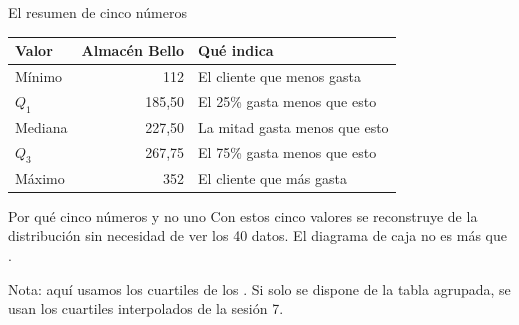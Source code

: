 \documentclass[aspectratio=169,10pt]{beamer}
\begin{document}
\begin{frame}{El resumen de cinco números}
  \footnotesize
  \begin{center}
  \begin{tabular}{@{}lrl@{}}
    \toprule
    \textbf{Valor} & \textbf{Almacén Bello} & \textbf{Qué indica} \\
    \midrule
    Mínimo   & 112 & El cliente que menos gasta \\
    $Q_1$    & 185{,}50 & El 25\% gasta menos que esto \\
    Mediana  & 227{,}50 & La mitad gasta menos que esto \\
    $Q_3$    & 267{,}75 & El 75\% gasta menos que esto \\
    Máximo   & 352 & El cliente que más gasta \\
    \bottomrule
  \end{tabular}
  \end{center}

  \vspace{0.15cm}
  \begin{alertblock}{Por qué cinco números y no uno}
    \scriptsize
    Con estos cinco valores se reconstruye  de la distribución sin necesidad de ver los 40 datos. El
    diagrama de caja no es más que .
  \end{alertblock}

  \vspace{0.1cm}
  {\scriptsize\color{uniGris} Nota: aquí usamos los cuartiles de los
  . Si solo se dispone de la tabla agrupada, se usan los
  cuartiles interpolados de la sesión 7.}
\end{frame}

\end{document}
